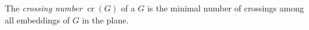 \documentclass[12pt]{article}
\DeclareMathOperator{\crn}{cr}
\begin{document}
The \emph{crossing number} $\crn(G)$ of a  $G$ is the minimal number of crossings among all embeddings of $G$ in the plane.
\end{document}
